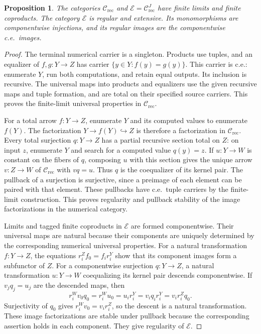 \documentclass[11pt]{article}
\newtheorem{proposition}[theorem]{Proposition}
\begin{document}
\begin{proposition}\label{prop:fork-total}
The categories $\mathcal C_{\mathrm{rec}}$ and
$\mathcal E=\mathcal C_{\mathrm{rec}}^J$ have finite limits and
finite coproducts. The category $\mathcal E$ is regular and
extensive. Its monomorphisms are componentwise injections, and its
regular images are the componentwise c.e.\ images.
\end{proposition}
\begin{proof}
The terminal numerical carrier is a singleton. Products use tuples,
and an equalizer of $f,g:Y\to Z$ has carrier
$\{y\in Y:f(y)=g(y)\}$. This carrier is c.e.: enumerate $Y$, run
both computations, and retain equal outputs. Its inclusion is
recursive. The universal maps into products and equalizers use the
given recursive maps and tuple formation, and are total on their
specified source carriers. This proves the finite-limit universal
properties in $\mathcal C_{\mathrm{rec}}$.

For a total arrow $f:Y\to Z$, enumerate $Y$ and its computed
values to enumerate $f(Y)$. The factorization
$Y\to f(Y)\hookrightarrow Z$ is therefore a factorization in
$\mathcal C_{\mathrm{rec}}$. Every total surjection
$q:Y\to Z$ has a partial recursive section total on $Z$: on input
$z$, enumerate $Y$ and search for a computed value $q(y)=z$.
If $u:Y\to W$ is constant on the fibers of $q$, composing $u$
with this section gives the unique arrow $v:Z\to W$ of
$\mathcal C_{\mathrm{rec}}$ with $vq=u$. Thus $q$ is the
coequalizer of its kernel pair.
The pullback of a surjection is surjective, since a preimage of
each element can be paired with that element. These pullbacks
have c.e.\ tuple carriers by the finite-limit construction.
This proves regularity and pullback stability of the image
factorizations in the numerical category.

Limits and tagged finite coproducts in $\mathcal E$ are formed
componentwise. Their universal maps are natural because their
components are uniquely determined by the corresponding numerical
universal properties. For a natural transformation $f:Y\to Z$,
the equations $r_i^Zf_0=f_i r_i^Y$ show that its component images
form a subfunctor of $Z$.
For a componentwise surjection $q:Y\to Z$, a natural transformation
$u:Y\to W$ coequalizing its kernel pair descends componentwise.
If $v_jq_j=u_j$ are the descended maps, then
\[
 r_i^Wv_0q_0=r_i^Wu_0=u_i r_i^Y
 =v_iq_i r_i^Y=v_i r_i^Zq_0.
\]
Surjectivity of $q_0$ gives $r_i^Wv_0=v_i r_i^Z$, so the
descent is a natural transformation. These image factorizations are stable
under pullback because the corresponding assertion holds in
each component. They give regularity of $\mathcal E$.


\end{proof}
\end{document}
